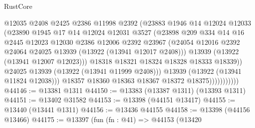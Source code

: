 \begin{lexlean}{RustCore}
\begin{coremodule}
                              @12035
                              @2408
                              @2425
                              @2386
                              @11998
                              @2392
                              (@23883
                                @1946
                                @14
                                @12024
                                @12033
                                (@23890
                                  @1945
                                  @17
                                  @14
                                  @12024
                                  @12031
                                  @3527
                                  (@23898
                                    @209
                                    @334
                                    @14
                                    @16
                                    @2445
                                    @12023
                                    @12030
                                    @2386
                                    @12006
                                    @2392
                                    @23967
                                    (@24054
                                      @12016
                                      @2392
                                      @24064
                                      @24025
                                      @13939
                                      (@13922 (@13941 @12017 @2408)))
                                    @13939
                                    (@13922 (@13941 @12007 @12023)))
                                  @18318
                                  @18321
                                  @18324
                                  @18328
                                  @18333
                                  @18339))
                              @24025
                              @13939
                              (@13922 (@13941 @11999 @2408)))
                            @13939
                            (@13922 (@13941 @11824 @12038)))
                          @18357
                          @18360
                          @18363
                          @18367
                          @18372
                          @18375)))))))))))
@44146 := @13381 @1311
@44150 := @13383 (@13387 @1311) (@13393 @1311)
@44151 := @13402 @31582
@44153 := @13398 (@44151 @13417)
@44155 := @13440 (@13441 @1311)
@44156 := @13436 @44155
@44158 := @13398 (@44156 @13466)
@44175 := @13397
    (fun (fn : @41) =>
    @44153
      (@13420

\end{coremodule}
\end{lexlean}
